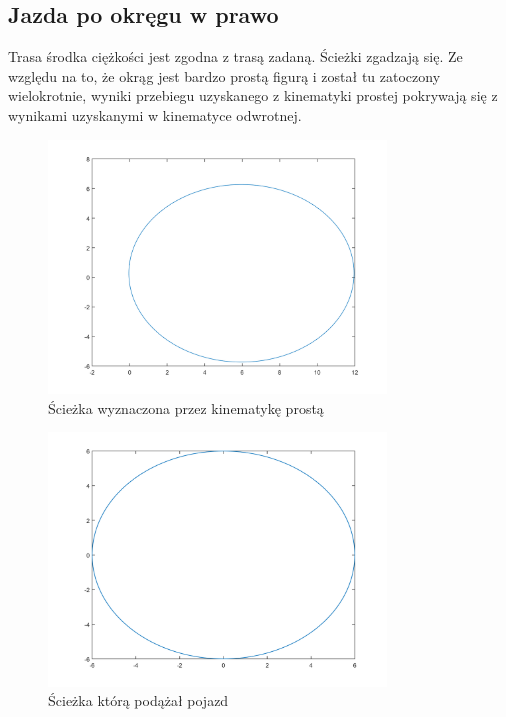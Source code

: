 \documentclass[a4paper, 12pt]{report}
\begin{document}
			\subsection{Jazda po okręgu w prawo}
				Trasa środka ciężkości jest zgodna z trasą zadaną. Ścieżki zgadzają się. Ze względu na to, że okrąg jest bardzo prostą figurą i został tu zatoczony wielokrotnie, wyniki przebiegu uzyskanego z kinematyki prostej pokrywają się z wynikami uzyskanymi w kinematyce odwrotnej. 
				\begin{figure}[H]
					\centering
					\includegraphics[width = 0.8\textwidth]{./AP/img/rev/right_circle_in_1.png}
					\caption{Ścieżka wyznaczona przez kinematykę prostą}
				\end{figure}
				\begin{figure}[H]
					\centering
					\includegraphics[width = 0.8\textwidth]{./AP/img/rev/right_circle_in_2.png}
					\caption{Ścieżka którą podążał pojazd}
				\end{figure}
\end{document}
